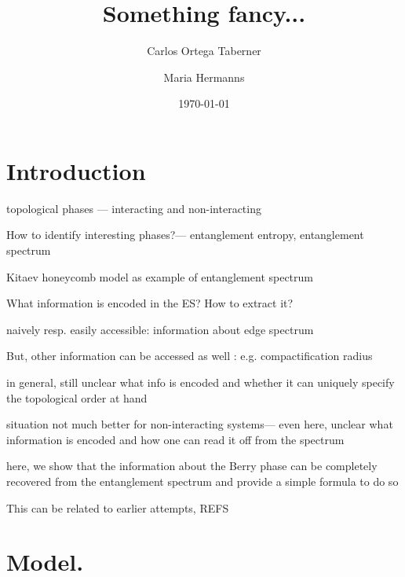 \documentclass[twocolumn,amsmath,longbibliography,amssymb,superscriptaddress]{revtex4-1}
\begin{document}
		
\title{Something fancy...}
\author{Carlos Ortega Taberner}

\author{Maria Hermanns}
\date{\today}
		
\maketitle
	


\section{Introduction}

topological phases --- interacting and non-interacting

How to identify interesting phases?--- entanglement entropy, entanglement spectrum

Kitaev honeycomb model as example of entanglement spectrum 

What information is encoded in the ES? How to extract it? 

naively resp. easily accessible: information about edge spectrum

But, other information can be accessed as well : e.g. compactification radius

in general, still unclear what info is encoded and whether it can uniquely specify the topological order at hand

situation not much better for non-interacting systems--- even here, unclear what information is encoded and how one can read it off from the spectrum

here, we show that the information about the Berry phase can be completely recovered from the entanglement spectrum and provide a simple formula to do so

This can be related to earlier attempts, REFS

\section{Model.}
\end{document}
